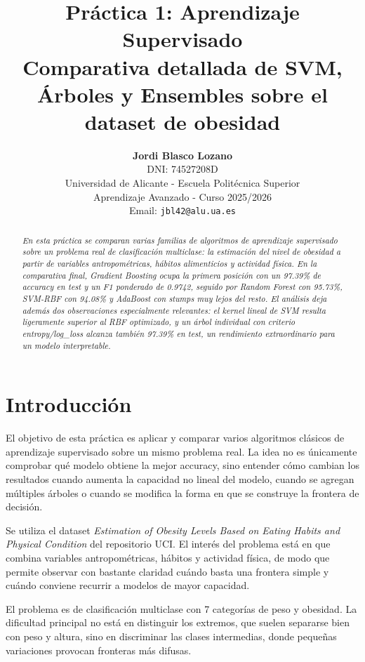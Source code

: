 \documentclass[11pt,a4paper]{article}
\title{\textbf{Práctica 1: Aprendizaje Supervisado}\\
\large Comparativa detallada de SVM, Árboles y Ensembles sobre el dataset de obesidad}
\author{
    \textbf{Jordi Blasco Lozano}\\
    \small DNI: 74527208D\\
    \small Universidad de Alicante - Escuela Politécnica Superior\\
    \small Aprendizaje Avanzado - Curso 2025/2026\\
    \small Email: \texttt{jbl42@alu.ua.es}
}
\date{}
\begin{document}
\maketitle

\begin{abstract}
\textit{
En esta práctica se comparan varias familias de algoritmos de aprendizaje supervisado sobre un problema real de clasificación multiclase: la estimación del nivel de obesidad a partir de variables antropométricas, hábitos alimenticios y actividad física. En la comparativa final, Gradient Boosting ocupa la primera posición con un {97.39\%} de accuracy en test y un {F1 ponderado de 0.9742}, seguido por Random Forest con {95.73\%}, SVM-RBF con {94.08\%} y AdaBoost con stumps muy lejos del resto. El análisis deja además dos observaciones especialmente relevantes: el kernel lineal de SVM resulta ligeramente superior al RBF optimizado, y un árbol individual con criterio {entropy}/{log\_loss} alcanza también {97.39\%} en test, un rendimiento extraordinario para un modelo interpretable.}
\end{abstract}

\vspace{0.5cm}

\section{Introducción}

El objetivo de esta práctica es aplicar y comparar varios algoritmos clásicos de aprendizaje supervisado sobre un mismo problema real. La idea no es únicamente comprobar qué modelo obtiene la mejor accuracy, sino entender cómo cambian los resultados cuando aumenta la capacidad no lineal del modelo, cuando se agregan múltiples árboles o cuando se modifica la forma en que se construye la frontera de decisión.

Se utiliza el dataset \textit{Estimation of Obesity Levels Based on Eating Habits and Physical Condition} del repositorio UCI. El interés del problema está en que combina variables antropométricas, hábitos y actividad física, de modo que permite observar con bastante claridad cuándo basta una frontera simple y cuándo conviene recurrir a modelos de mayor capacidad.

El problema es de clasificación multiclase con 7 categorías de peso y obesidad. La dificultad principal no está en distinguir los extremos, que suelen separarse bien con peso y altura, sino en discriminar las clases intermedias, donde pequeñas variaciones provocan fronteras más difusas.
\end{document}
